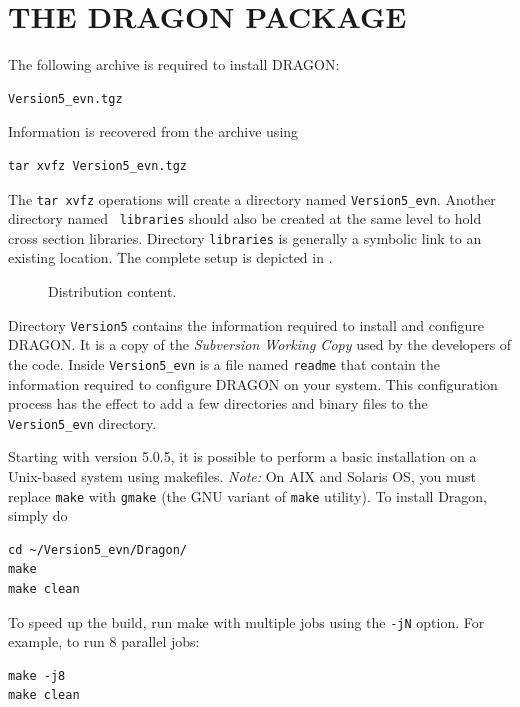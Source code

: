 \section{THE DRAGON PACKAGE}\label{sect:DragonExportPackage}

The following archive is required to install DRAGON:

\begin{verbatim}
Version5_evn.tgz
\end{verbatim}

\vskip 0.08cm

Information is recovered from the archive using
\begin{verbatim}
tar xvfz Version5_evn.tgz
\end{verbatim}

\noindent The {\tt tar xvfz} operations will create a directory named {\tt Version5\_evn}. Another directory named {\tt
libraries} should also be created at the same level to hold cross section libraries. Directory {\tt libraries} is
generally a symbolic link to an existing location. The complete setup is depicted in .

\begin{figure}[h!]  
\begin{center} 
\epsfxsize=10cm \centerline{ }
\parbox{16cm}{\caption{Distribution content.}\label{fig:tree2}}    
\end{center}  
\end{figure}

Directory {\tt Version5} contains the information required to install and configure
DRAGON. It is a copy of the {\sl Subversion Working Copy} used by the developers of the
code. Inside {\tt Version5\_evn} is a file named {\tt readme} that contain the
information required to configure DRAGON on your system. This configuration
process has the effect to add a few directories and binary files to the
{\tt Version5\_evn} directory.

\vskip 0.08cm

Starting with version 5.0.5, it is possible to perform a basic installation on a Unix-based system
using makefiles. {\sl Note:} On AIX and Solaris OS, you must replace {\tt make} with {\tt gmake} (the
GNU variant of {\tt make} utility). To install Dragon, simply do
\begin{verbatim}
cd ~/Version5_evn/Dragon/
make
make clean
\end{verbatim}

To speed up the build, run make with multiple jobs using the \texttt{-jN} option.  For example, to run 8 parallel jobs:
\begin{verbatim}
make -j8
make clean
\end{verbatim}

